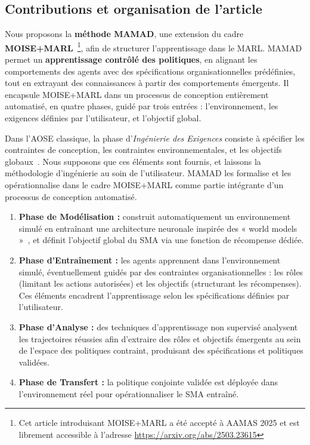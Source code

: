 \documentclass[pdflatex,sn-mathphys-num]{sn-jnl}%
\theoremstyle{thmstyleone}%
\theoremstyle{thmstyletwo}%
\theoremstyle{thmstylethree}%
\begin{document}
\subsection{Contributions et organisation de l'article}

Nous proposons la \textbf{méthode MAMAD}, une extension du cadre \textbf{MOISE+MARL}~\cite{soule2025moisemarl}\footnote{Cet article introduisant MOISE+MARL a été accepté à AAMAS 2025 et est librement accessible à l'adresse \url{https://arxiv.org/abs/2503.23615}}, afin de structurer l'apprentissage dans le MARL. MAMAD permet un \textbf{apprentissage contrôlé des politiques}, en alignant les comportements des agents avec des spécifications organisationnelles prédéfinies, tout en extrayant des connaissances à partir des comportements émergents. Il encapsule MOISE+MARL dans un processus de conception entièrement automatisé, en quatre phases, guidé par trois entrées : l'environnement, les exigences définies par l'utilisateur, et l'objectif global.

Dans l'AOSE classique, la phase d'\textit{Ingénierie des Exigences} consiste à spécifier les contraintes de conception, les contraintes environnementales, et les objectifs globaux~\cite{Pavon2003, Bernon2005}. Nous supposons que ces éléments sont fournis, et laissons la méthodologie d'ingénierie au soin de l'utilisateur. MAMAD les formalise et les opérationnalise dans le cadre MOISE+MARL comme partie intégrante d'un processus de conception automatisé.

\begin{enumerate}
    \item \textbf{Phase de Modélisation :} construit automatiquement un environnement simulé en entraînant une architecture neuronale inspirée des « world models »~\cite{Ha2018}, et définit l'objectif global du SMA via une fonction de récompense dédiée.
    \item \textbf{Phase d'Entraînement :} les agents apprennent dans l'environnement simulé, éventuellement guidés par des contraintes organisationnelles : les rôles (limitant les actions autorisées) et les objectifs (structurant les récompenses). Ces éléments encadrent l'apprentissage selon les spécifications définies par l'utilisateur.
    \item \textbf{Phase d'Analyse :} des techniques d'apprentissage non supervisé analysent les trajectoires réussies afin d'extraire des rôles et objectifs émergents au sein de l'espace des politiques contraint, produisant des spécifications et politiques validées.
    \item \textbf{Phase de Transfert :} la politique conjointe validée est déployée dans l'environnement réel pour opérationnaliser le SMA entraîné.
\end{enumerate}
\end{document}
